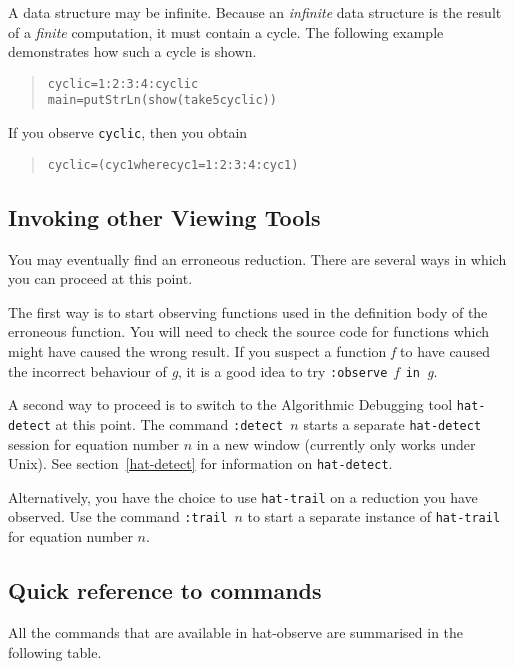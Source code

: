 \documentclass[12pt]{article}
\newcommand{\com}[1]{\texttt{#1}}
\begin{document}
A data structure may be infinite. Because an \emph{infinite} data
structure is the result of a \emph{finite} computation, it must contain
a cycle. The following example demonstrates how such a cycle is shown.

\begin{quote}
\begin{alltt}
cyclic = 1:2:3:4:cyclic
main = putStrLn (show (take 5 cyclic))
\end{alltt}
\end{quote}

If you observe \texttt{cyclic}, then you obtain
\begin{quote}
\begin{alltt}
cyclic = (cyc1 where cyc1 = 1:2:3:4:cyc1)
\end{alltt}
\end{quote}


\subsection{Invoking other Viewing Tools}\label{othersFromObserve}

You may eventually find an erroneous reduction.
There are several ways in which you can proceed at this point.

The first way is to start observing functions used in the definition
body of the erroneous function. You will need to check the source code
for functions which might have caused the wrong result. If you suspect
a function \emph{f} to have caused the incorrect behaviour of \emph{g},
it is a good idea to try \com{:observe}~\emph{f}~\com{in}~\emph{g}.

A second way to proceed is to switch to the Algorithmic Debugging tool
\texttt{hat-detect} at this point.
The command \texttt{:detect $n$} starts a separate \texttt{hat-detect}
session for equation number $n$ in a new window (currently only
works under Unix).  See section~\ref{hat-detect} for information
on \texttt{hat-detect}.

Alternatively, you have the choice to use \texttt{hat-trail} on a
reduction you have observed. Use the command \texttt{:trail $n$}
to start a separate instance of \texttt{hat-trail} for equation
number $n$.


\subsection{Quick reference to commands}

All the commands that are available in hat-observe are summarised in
the following table.
\end{document}
